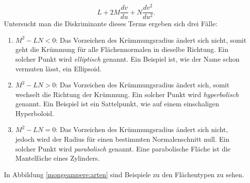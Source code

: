\begin{equation}
   L + 2M \frac{d v}{d u} + N \frac{d v^2}{d u ^2}.
  \label{mongemapere:dsik}
\end{equation}
Untersucht man die Diskriminante dieses Terms ergeben sich drei Fälle:
%
\begin{enumerate}
  \item $M^2 - LN < 0$: Das Vorzeichen des Krümmungsradius ändert sich nicht, somit geht die Krümmung für alle 
    Flächennormalen in dieselbe Richtung. 
    Ein solcher Punkt wird \emph{elliptisch} genannt. Ein Beispiel ist, wie der 
%
%
%
    Name schon vermuten lässt, ein Ellipsoid.
  \item $M^2 - LN > 0$: Das Vorzeichen des Krümmungsradius ändert sich, somit wechselt die Richtung der Krümmung.
    Ein solcher Punkt wird \emph{hyperbolisch} genannt. Ein Beispiel ist ein Sattelpunkt, wie auf einem einschaligen Hyperboloid.
%
%
%
%
  \item $M^2 - LN = 0$: Das Vorzeichen des Krümmungsradius ändert sich nicht, jedoch wird der Radius für einen 
    bestimmten Normalenschnitt null. 
    Ein solcher Punkt wird \emph{parabolisch} genannt. Eine parabolische Fläche ist die Mantelfäche eines Zylinders. 
%
%
%
%
\end{enumerate}
In Abbildung \ref{mongeampere:arten} sind Beispiele zu den Flächentypen zu sehen.
